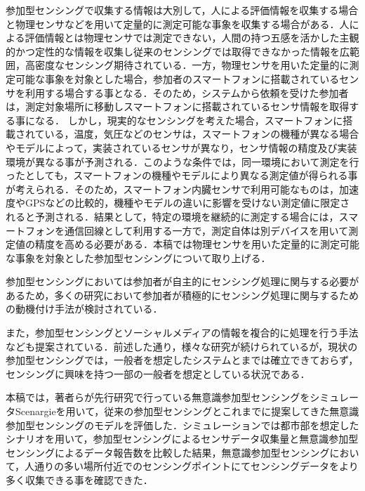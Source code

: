 \documentclass[submit,techrep]{ipsj}
\begin{document}
参加型センシングで収集する情報は大別して，人による評価情報を収集する場合\cite{Lam}と物理センサなどを用いて定量的に測定可能な事象を収集する場合\cite{Shinohara}がある．人による評価情報とは物理センサでは測定できない，人間の持つ五感を活かした主観的かつ定性的な情報を収集し従来のセンシングでは取得できなかった情報を広範囲，高密度なセンシング期待されている．一方，物理センサを用いた定量的に測定可能な事象を対象とした場合，参加者のスマートフォンに搭載されているセンサを利用する場合する事となる．そのため，システムから依頼を受けた参加者は，測定対象場所に移動しスマートフォンに搭載されているセンサ情報を取得する事になる．
しかし，現実的なセンシングを考えた場合，スマートフォンに搭載されている，温度，気圧などのセンサは，スマートフォンの機種が異なる場合やモデルによって，実装されているセンサが異なり，センサ情報の精度及び実装環境が異なる事が予測される．このような条件では，同一環境において測定を行ったとしても，スマートフォンの機種やモデルにより異なる測定値が得られる事が考えられる．そのため，スマートフォン内臓センサで利用可能なものは，加速度やGPSなどの比較的，機種やモデルの違いに影響を受けない測定値に限定されると予測される．結果として，特定の環境を継続的に測定する場合には，スマートフォンを通信回線として利用する一方で，測定自体は別デバイスを用いて測定値の精度を高める必要がある\cite{Li}．本稿では物理センサを用いた定量的に測定可能な事象を対象とした参加型センシングについて取り上げる．


参加型センシングにおいては参加者が自主的にセンシング処理に関与する必要があるため，多くの研究において参加者が積極的にセンシング処理に関与するための動機付け手法が検討されている\cite{Yoshitaka}．


また，参加型センシングとソーシャルメディアの情報を複合的に処理を行う手法なども提案されている\cite{Demirbas}．前述した通り，様々な研究が続けられているが，現状の参加型センシングでは，一般者を想定したシステムとまでは確立できておらず，センシングに興味を持つ一部の一般者を想定としている状況である．

本稿では，著者らが先行研究\cite{Mizukami}で行っている無意識参加型センシングをシミュレータScenargie\cite{Scenargie}を用いて，従来の参加型センシングとこれまでに提案してきた無意識参加型センシングのモデルを評価した．シミュレーションでは都市部を想定したシナリオを用いて，参加型センシングによるセンサデータ収集量と無意識参加型センシングによるデータ報告数を比較した結果，無意識参加型センシングにおいて，人通りの多い場所付近でのセンシングポイントにてセンシングデータをより多く収集できる事を確認できた．



\end{document}
